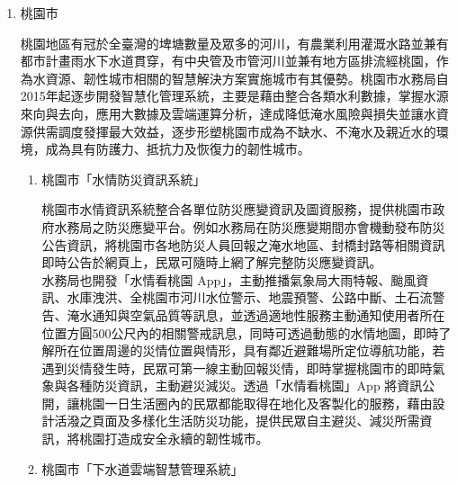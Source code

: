 \documentclass[a4paper,12pt]{article}
\begin{document}
\begin{enumerate}
\begin{enumerate}
「脫煤者聯盟」係由英國和加拿大政府共同成立，致力於將燃煤發電轉換為乾淨能源，透過與各國地方政府及組織共同推動老舊燃煤電廠退場，逐步停止使用燃煤以減緩氣候變遷衝擊，並協助實現巴黎協定目標，控制地球氣溫的上升幅度在與「前工業時代」相比最多\(2^{\circ}C\)之範圍。該聯盟現有91個成員，包括32個國家，25個地方政府和34個企業組織，新北市為臺灣第一個，也是繼韓國忠清南道後亞洲第二個加入聯盟的地方政府成員，將持續於國際平臺分享新北市減緩氣候變遷及燃煤退場經驗，增進互動與交流\footnote{\href{https://www.epd.ntpc.gov.tw/Article/Info?ID=6011}{全國第一 新北正式成為「脫煤者聯盟」成員 與英、加等國攜手對抗氣候變遷}\\}。\\
\end{enumerate}

\item 桃園市
\label{sec:org549ede0}

桃園地區有冠於全臺灣的埤塘數量及眾多的河川，有農業利用灌溉水路並兼有都市計畫雨水下水道貫穿，有中央管及市管河川並兼有地方區排流經桃園，作為水資源、韌性城市相關的智慧解決方案實施城市有其優勢。桃園市水務局自2015年起逐步開發智慧化管理系統，主要是藉由整合各類水利數據，掌握水源來向與去向，應用大數據及雲端運算分析，達成降低淹水風險與損失並讓水資源供需調度發揮最大效益，逐步形塑桃園市成為不缺水、不淹水及親近水的環境，成為具有防護力、抵抗力及恢復力的韌性城市。\\

\begin{enumerate}
\item 桃園市「水情防災資訊系統」
\label{sec:orge9e11fb}

桃園市水情資訊系統整合各單位防災應變資訊及圖資服務，提供桃園市政府水務局之防災應變平台。例如水務局在防災應變期間亦會機動發布防災公告資訊，將桃園市各地防災人員回報之淹水地區、封橋封路等相關資訊即時公告於網頁上，民眾可隨時上網了解完整防災應變資訊。\\

水務局也開發「水情看桃園 App」，主動推播氣象局大雨特報、颱風資訊、水庫洩洪、全桃園市河川水位警示、地震預警、公路中斷、土石流警告、淹水通知與空氣品質等訊息，並透過適地性服務主動通知使用者所在位置方圓500公尺內的相關警戒訊息，同時可透過動態的水情地圖，即時了解所在位置周邊的災情位置與情形，具有鄰近避難場所定位導航功能，若遇到災情發生時，民眾可第一線主動回報災情，即時掌握桃園市的即時氣象與各種防災資訊，主動避災減災。透過「水情看桃園」App 將資訊公開，讓桃園一日生活圈內的民眾都能取得在地化及客製化的服務，藉由設計活潑之頁面及多樣化生活防災功能，提供民眾自主避災、減災所需資訊，將桃園打造成安全永續的韌性城市。\\
\item 桃園市「下水道雲端智慧管理系統」
\label{sec:org5c6b2e2}


\end{enumerate}
\end{enumerate}
\end{document}
